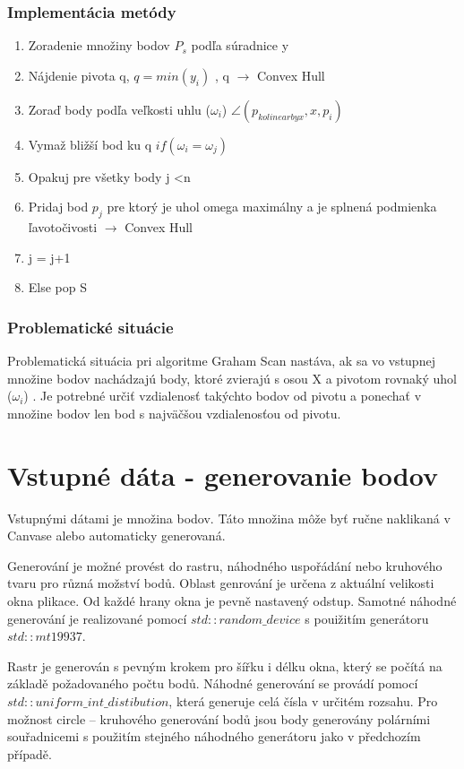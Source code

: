 \documentclass[12pt]{article}
\begin{document}
\subsubsection{Implementácia metódy}
\begin{enumerate}
	\item Zoradenie množiny bodov $P_s$ podľa súradnice y 
	\item Nájdenie pivota q, $ q = min(y_i)$ , q $\to$ Convex Hull
	\item Zoraď body podľa veľkosti uhlu  ($\omega_i$) $ \angle(p_{kolinearbyx}, x, p_i)$
	\item Vymaž bližší bod ku q $ if(\omega_i = \omega_j) $
	\item Opakuj pre všetky body j \textless  n
	\item Pridaj bod $p_j$ pre ktorý je uhol omega maximálny a je splnená podmienka ľavotočivosti  $\to$ Convex Hull
	\item \hspace {1.5cm} j = j+1
	\item Else pop S	
\end{enumerate}
\subsubsection{Problematické situácie}
Problematická situácia pri algoritme Graham Scan nastáva, ak sa vo vstupnej množine bodov nachádzajú body, ktoré zvierajú s osou X a pivotom rovnaký uhol ($\omega_i$) . Je potrebné určiť vzdialenosť takýchto bodov od pivotu a ponechať v množine bodov len bod s najväčšou vzdialenosťou od pivotu.
\clearpage 
\section{Vstupné dáta - generovanie bodov}
Vstupnými dátami je množina bodov. Táto množina môže byť ručne naklikaná v Canvase alebo automaticky generovaná.

Generování je možné provést do rastru, náhodného uspořádání nebo kruhového tvaru pro různá možství bodů. Oblast genrování je určena z aktuální velikosti okna plikace. Od každé hrany okna je pevně nastavený odstup. Samotné náhodné generování je realizované pomocí $std:: random\_device$ s pouižitím generátoru $std::mt19937$.

Rastr je generován s pevným krokem pro šířku i délku okna, který se počítá na základě požadovaného počtu bodů. Náhodné generování se provádí pomocí $std::uniform\_int\_distibution$, která generuje celá čísla v určitém rozsahu. Pro možnost circle -- kruhového generování bodů jsou body generovány polárními souřadnicemi s použitím stejného náhodného generátoru jako v předchozím případě.
\end{document}
